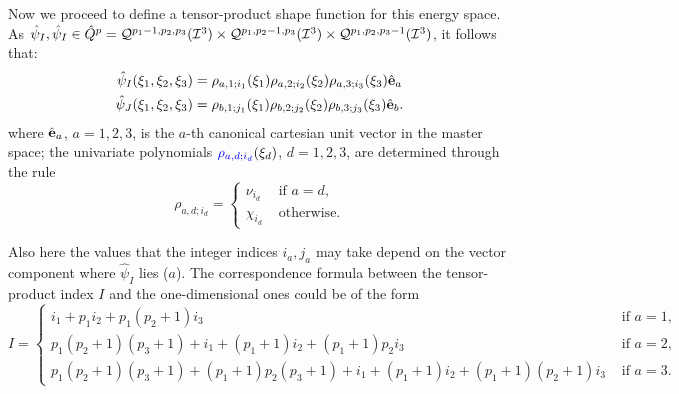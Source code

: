 Now we proceed to define a tensor-product shape function for this energy space. As $\hat{\psi}_I,\hat{\psi}_I\in \hat{Q}^p=\mathcal{Q}^{p_1-1,p_2,p_3}(\mathcal{I}^3)\times\mathcal{Q}^{p_1,p_2-1,p_3}(\mathcal{I}^3)\times\mathcal{Q}^{p_1,p_2,p_3-1}(\mathcal{I}^3)$, it follows that:
\begin{equation}
    \begin{aligned}
    \hat{\psi}_I(\xi_1,\xi_2,\xi_3)&= \rho_{a,1;i_1}(\xi_1)\rho_{a,2;i_2}(\xi_2)\rho_{a,3;i_3}(\xi_3)\hat{\mathbf{e}}_a\\
    \hat{\psi}_J(\xi_1,\xi_2,\xi_3)&= \rho_{b,1;j_1}(\xi_1)\rho_{b,2;j_2}(\xi_2)\rho_{b,3;j_3}(\xi_3)\hat{\mathbf{e}}_b.
    \end{aligned}
    \label{hcurltensor}
\end{equation}
%
where $\hat{\mathbf{e}}_a$, $a=1,2,3$, is the $a$-th canonical cartesian unit vector in the master space; the univariate polynomials ${\color{blue}\rho_{a,d;i_d}}(\xi_d)$, $d=1,2,3$, are determined through the rule
\begin{equation}
    \rho_{a,d;i_d}=  \begin{cases}
                    \nu_{i_d}&\text{ if }a=d,\\
                    \chi_{i_d} &\text{ otherwise.}
                    \end{cases}
    \label{hcurlrule}
\end{equation}

Also here the values that the integer indices $i_a,j_a$ may take depend on the vector component where $\hat{\psi}_I$ lies ($a$). The correspondence formula between the tensor-product index $I$ and the one-dimensional ones could be of the form
\begin{equation}
    I=  \begin{cases}
            i_1+p_1i_2+p_1(p_2+1)i_3 & \text{ if }a=1,\\
            p_1(p_2+1)(p_3+1)+i_1+(p_1+1)i_2+(p_1+1)p_2i_3 & \text{ if }a=2,\\
            p_1(p_2+1)(p_3+1)+(p_1+1)p_2(p_3+1)+i_1+(p_1+1)i_2+(p_1+1)(p_2+1)i_3 & \text{ if }a=3.
        \end{cases}
        \label{hcurltensorindex}
\end{equation}

